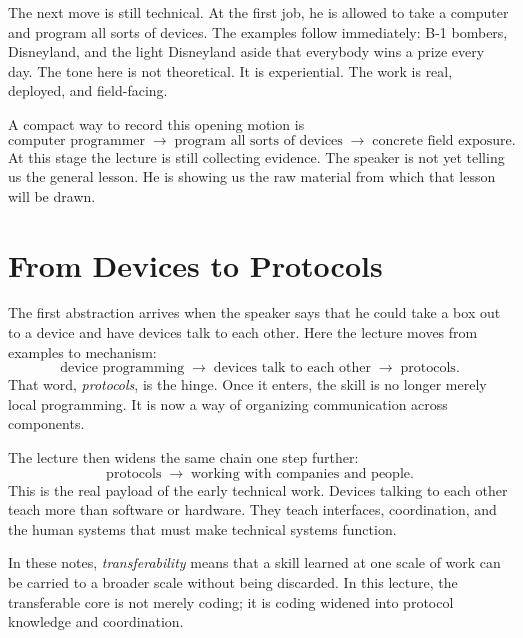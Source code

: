 The next move is still technical. At the first job, he is allowed to take a computer and program all sorts of devices. The examples follow immediately: B-1 bombers, Disneyland, and the light Disneyland aside that everybody wins a prize every day. The tone here is not theoretical. It is experiential. The work is real, deployed, and field-facing.

A compact way to record this opening motion is
\begin{equation}
\text{computer programmer}
\;\to\;
\text{program all sorts of devices}
\;\to\;
\text{concrete field exposure}.
\end{equation}
At this stage the lecture is still collecting evidence. The speaker is not yet telling us the general lesson. He is showing us the raw material from which that lesson will be drawn.

\section{From Devices to Protocols}

The first abstraction arrives when the speaker says that he could take a box out to a device and have devices talk to each other. Here the lecture moves from examples to mechanism:
\begin{equation}
\text{device programming}
\;\to\;
\text{devices talk to each other}
\;\to\;
\text{protocols}.
\end{equation}
That word, \emph{protocols}, is the hinge. Once it enters, the skill is no longer merely local programming. It is now a way of organizing communication across components.

The lecture then widens the same chain one step further:
\begin{equation}
\text{protocols}
\;\to\;
\text{working with companies and people}.
\end{equation}
This is the real payload of the early technical work. Devices talking to each other teach more than software or hardware. They teach interfaces, coordination, and the human systems that must make technical systems function.

\begin{definition}
In these notes, \emph{transferability} means that a skill learned at one scale of work can be carried to a broader scale without being discarded. In this lecture, the transferable core is not merely coding; it is coding widened into protocol knowledge and coordination.
\end{definition}

